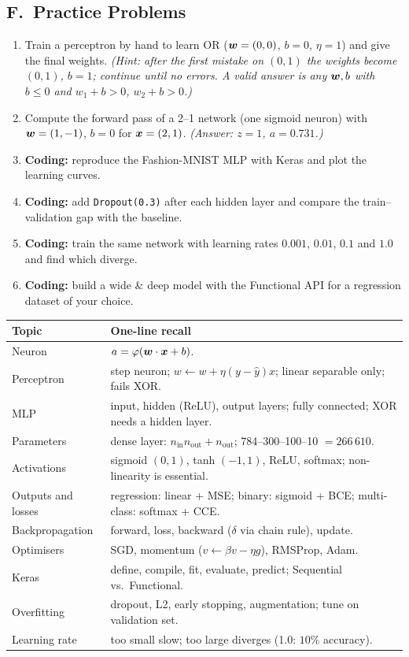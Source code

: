 \subsection*{F.\ Practice Problems}
\begin{enumerate}
  \item Train a perceptron by hand to learn OR ($\boldsymbol{w}=(0,0)$, $b=0$, $\eta=1$) and give the final weights. \textit{(Hint: after the first mistake on $(0,1)$ the weights become $(0,1)$, $b=1$; continue until no errors. A valid answer is any $\boldsymbol{w},b$ with $b\le0$ and $w_1+b>0$, $w_2+b>0$.)}
  \item Compute the forward pass of a 2--1 network (one sigmoid neuron) with $\boldsymbol{w}=(1,-1)$, $b=0$ for $\boldsymbol{x}=(2,1)$. \textit{(Answer: $z=1$, $a=0.731$.)}
  \item \textbf{Coding:} reproduce the Fashion-MNIST MLP with Keras and plot the learning curves.
  \item \textbf{Coding:} add \texttt{Dropout(0.3)} after each hidden layer and compare the train--validation gap with the baseline.
  \item \textbf{Coding:} train the same network with learning rates $0.001$, $0.01$, $0.1$ and $1.0$ and find which diverge.
  \item \textbf{Coding:} build a wide \& deep model with the Functional API for a regression dataset of your choice.
\end{enumerate}

\begin{revision}
\begin{center}\small
\begin{tabular}{@{}p{3.6cm}p{9.6cm}@{}}
\toprule
\textbf{Topic} & \textbf{One-line recall}\\
\midrule
Neuron & $a=\varphi(\boldsymbol{w}\cdot\boldsymbol{x}+b)$.\\
Perceptron & step neuron; $w\leftarrow w+\eta(y-\hat y)x$; linear separable only; fails XOR.\\
MLP & input, hidden (ReLU), output layers; fully connected; XOR needs a hidden layer.\\
Parameters & dense layer: $n_{\text{in}}n_{\text{out}}+n_{\text{out}}$; 784--300--100--10 $=266\,610$.\\
Activations & sigmoid $(0,1)$, tanh $(-1,1)$, ReLU, softmax; non-linearity is essential.\\
Outputs and losses & regression: linear + MSE; binary: sigmoid + BCE; multi-class: softmax + CCE.\\
Backpropagation & forward, loss, backward ($\delta$ via chain rule), update.\\
Optimisers & SGD, momentum ($v\leftarrow\beta v-\eta g$), RMSProp, Adam.\\
Keras & define, compile, fit, evaluate, predict; Sequential vs.\ Functional.\\
Overfitting & dropout, L2, early stopping, augmentation; tune on validation set.\\
Learning rate & too small slow; too large diverges (1.0: $10\%$ accuracy).\\
\bottomrule
\end{tabular}
\end{center}
\end{revision}
